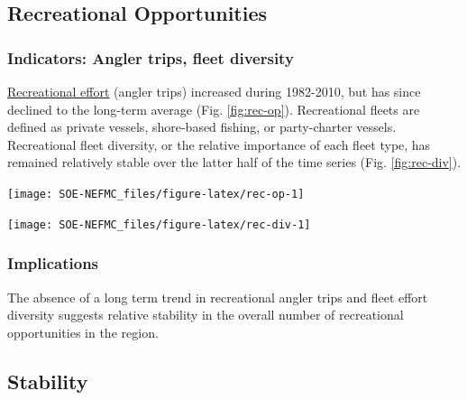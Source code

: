 \documentclass[
  10pt,
]{article}
\let\origfigure\figure
\let\endorigfigure\endfigure
\renewenvironment{figure}[1][2] {
    \expandafter\origfigure\expandafter[H]
} {
    \endorigfigure
}
\begin{document}
\hypertarget{recreational-opportunities}{%
\subsection{Recreational Opportunities}\label{recreational-opportunities}}

\hypertarget{indicators-angler-trips-fleet-diversity}{%
\subsubsection{Indicators: Angler trips, fleet diversity}\label{indicators-angler-trips-fleet-diversity}}

\href{https://noaa-edab.github.io/catalog/recdat.html}{Recreational effort} (angler trips) increased during 1982-2010, but has since declined to the long-term average (Fig. \ref{fig:rec-op}). Recreational fleets are defined as private vessels, shore-based fishing, or party-charter vessels. Recreational fleet diversity, or the relative importance of each fleet type, has remained relatively stable over the latter half of the time series (Fig. \ref{fig:rec-div}).

\begin{figure}

{\centering \texttt{[image: SOE-NEFMC\_files/figure-latex/rec-op-1]} 

}

\caption{Recreational effort in New England.}\label{fig:rec-op}
\end{figure}
\begin{figure}

{\centering \texttt{[image: SOE-NEFMC\_files/figure-latex/rec-div-1]} 

}

\caption{Recreational fleet effort diversity in New England.}\label{fig:rec-div}
\end{figure}

\hypertarget{implications-2}{%
\subsubsection{Implications}\label{implications-2}}

The absence of a long term trend in recreational angler trips and fleet effort diversity suggests relative stability in the overall number of recreational opportunities in the region.

\hypertarget{stability}{%
\subsection{Stability}\label{stability}}
\end{document}
